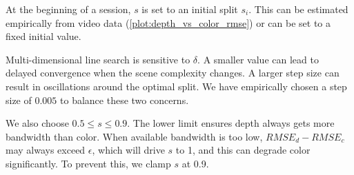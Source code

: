 
At the beginning of a session, $s$ is set to an initial split $s_i$.
%
This can be estimated empirically from video data (\eg \cref{plot:depth_vs_color_rmse}) or can be set to a fixed initial value.
%

Multi-dimensional line search is sensitive to $\delta$.
%
A smaller value can lead to delayed convergence when the scene complexity changes.
%
A larger step size can result in oscillations around the optimal split.
%
We have empirically chosen a step size of $0.005$ to balance these two concerns.
%

We also choose  $0.5 \leq s \leq 0.9$.
%
The lower limit ensures depth always gets more bandwidth than color.
%
%
When available bandwidth is too low, $RMSE_d - RMSE_c$ may always exceed $\epsilon$, which will drive $s$ to 1, and this can degrade color significantly. %
%
To prevent this, we clamp $s$ at 0.9.






